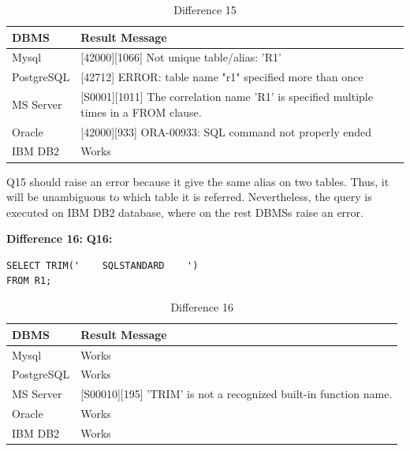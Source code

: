 \begin{table}[h]
\centering
\caption{Difference 15}
\label{my-label}
\begin{tabular}{|p{2cm}|p{11.5cm}| }
\hline
\textbf{DBMS} & \textbf{Result Message}                                                                       \\ \hline
Mysql         & {[}42000{]}{[}1066{]} Not unique table/alias: 'R1'                                            \\ \hline
PostgreSQL    & {[}42712{]} ERROR: table name "r1" specified more than once                                   \\ \hline
MS Server     & {[}S0001{]}{[}1011{]} The correlation name 'R1' is specified multiple times in a FROM clause. \\ \hline
Oracle        & {[}42000{]}{[}933{]} ORA-00933: SQL command not properly ended                                \\ \hline
IBM DB2       & Works                                                                                         \\ \hline
\end{tabular}
\end{table}

Q15 should raise an error because it give the same alias on two tables. Thus, it will be unambiguous to which table it is referred. Nevertheless, the query is executed on IBM DB2 database, where on the rest DBMSs raise an error. 


\hfill\newline\textbf{Difference 16:}
\hfill\newline\textbf{Q16:}

\begin{mdframed}[backgroundcolor=lightgray!20]
\begin{lstlisting}[style=SQL]
SELECT TRIM('    SQLSTANDARD    ')
FROM R1;
\end{lstlisting}
\end{mdframed}

\begin{table}[h]
\centering
\caption{Difference 16}
\label{my-label}
\begin{tabular}{|p{2cm}|p{11.5cm}| }
\hline
\textbf{DBMS} & \textbf{Result Message}                                                  \\ \hline
Mysql         & Works                                                                    \\ \hline
PostgreSQL    & Works                                                                    \\ \hline
MS Server     & {[}S00010{]}{[}195{]} 'TRIM' is not a recognized built-in function name. \\ \hline
Oracle        & Works                                                                    \\ \hline
IBM DB2       & Works                                                                    \\ \hline
\end{tabular}
\end{table}

